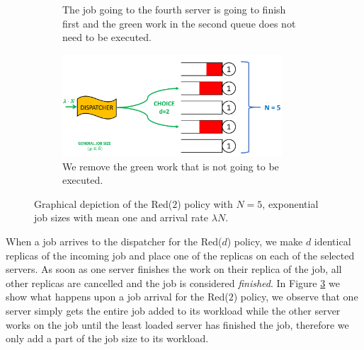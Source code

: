 \documentclass[12pt]{report}
\begin{document}
\begin{figure}[t]
\begin{subfigure}{.45\textwidth}
\begin{center}
\caption{The job going to the fourth server is going to finish first and the green work in the second queue does not need to be executed.}
\label{fig:Redd3}
\end{center}
\end{subfigure}
\begin{subfigure}{.45\textwidth}
\begin{center}
\includegraphics[width=0.9\textwidth]{figures/Chapter3/Redd4.PNG}
\caption{We remove the green work that is not going to be executed.}
\label{fig:Redd4}
\end{center}
\end{subfigure}
\caption{Graphical depiction of the Red($2$) policy with $N=5$, exponential job sizes with mean one and arrival rate $\lambda N$.}\label{fig:Redd}
\end{figure}
When a job arrives to the dispatcher for the Red($d$) policy, we make $d$ identical replicas of the incoming job and place one of the replicas on each of the selected servers. As soon as one server finishes the work on their replica of the job, all other replicas are cancelled and the job is considered \textit{finished}. In Figure \ref{fig:Redd} we show what happens upon a job arrival for the Red($2$) policy, we observe that one server simply gets the entire job added to its workload while the other server works on the job until the least loaded server has finished the job, therefore we only add a part of the job size to its workload.
\end{document}
